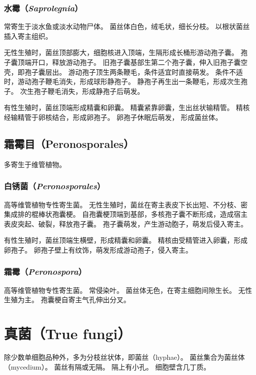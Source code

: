 \documentclass[11pt]{article}
\begin{document}
\subsubsection{水霉（\textit{Saprolegnia}）}
常寄生于淡水鱼或淡水动物尸体。
菌丝体白色，绒毛状，细长分枝。
以根状菌丝插入寄主组织。

\par

无性生殖时，菌丝顶部膨大，细胞核进入顶端，生隔形成长桶形游动孢子囊。
孢子囊顶端开口，释放游动孢子。
旧孢子囊基部生第二个孢子囊，伸入旧孢子囊空壳，即孢子囊层出。
游动孢子顶生两条鞭毛，条件适宜时直接萌发。
条件不适时，游动孢子鞭毛消失，形成球形静孢子。
静孢子再生出一条鞭毛，形成次生孢子。
次生孢子鞭毛消失，形成静孢子后萌发。

\par

有性生殖时，菌丝顶端形成精囊和卵囊。
精囊紧靠卵囊，生出丝状输精管。
精核经输精管于卵核结合，形成卵孢子。
卵孢子休眠后萌发，
形成菌丝体。

\subsection{霜霉目（Peronosporales）}
多寄生于维管植物。

\subsubsection{白锈菌（\textit{Peronosporales}）}
高等维管植物专性寄生菌。
无性生殖时，菌丝在寄主表皮下长出短、不分枝、密集成排的棍棒状孢囊梗。
自孢囊梗顶端到基部，多核孢子囊不断形成，造成宿主表皮突起、破裂，释放孢子囊。
孢子囊萌发，产生游动胞子，萌发后侵入寄主。

\par

有性生殖时，菌丝顶端生横壁，形成精囊和卵囊。
精核由受精管进入卵囊，形成卵孢子。
卵孢子壁上有纹饰，萌发形成游动孢子，侵入寄主。

\subsubsection{霜霉（\textit{Peronospora}）}
高等维管植物专性寄生菌。
常侵染叶。
菌丝体无色，在寄主细胞间隙生长。
无性生殖为主。
孢囊梗自寄主气孔伸出分叉。

\section{真菌（True fungi）}
除少数单细胞品种外，多为分枝丝状体，即菌丝（hyphae）。
菌丝集合为菌丝体（mycedium）。
菌丝有隔或无隔。
隔上有小孔。
细胞壁含几丁质。
\end{document}
